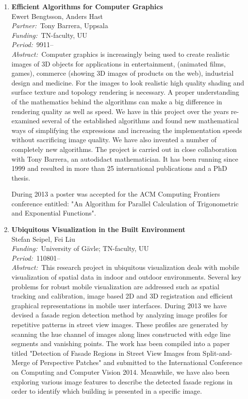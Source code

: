 \documentclass[10pt, a4paper]{article}
\newcommand{\aabstract}[1]{\emph{Abstract:~}#1}
\newcommand{\ffunding}[1]{\emph{Funding:~}#1\\}
\newcommand{\ppartner}[1]{\emph{Partner:~}#1\\}
\newcommand{\pperiod}[1]{\emph{Period:~}#1\\}
\begin{document}
\begin{enumerate}

\item \textbf{Efficient Algorithms for Computer Graphics}\\
Ewert Bengtsson, Anders Hast \\
\ppartner{Tony Barrera, Uppsala}
\ffunding{TN-faculty, UU}
\pperiod{9911--}
\aabstract{Computer graphics is increasingly being used to create realistic images of 3D objects for applications in entertainment, (animated films, games), commerce (showing 3D images of products on the web), industrial design and medicine. For the images to look realistic high quality shading and surface texture and topology rendering is necessary. A proper understanding of the mathematics behind the algorithms can make a big difference in rendering quality as well as speed. We have in this project over the years re-examined several of the established algorithms and found new mathematical ways of simplifying the expressions and increasing the implementation speeds without sacrificing image quality. We have also invented a number of completely new algorithms. The project is carried out in close collaboration with Tony Barrera, an autodidact mathematician. It has been running since 1999 and resulted in more than 25 international publications and a PhD thesis.

During 2013 a poster was accepted for the ACM Computing Frontiers conference entitled: "An Algorithm for Parallel Calculation of Trigonometric and Exponential Functions".}


\item \textbf{Ubiquitous Visualization in the Built Environment}\\
Stefan Seipel, Fei Liu\\
\ffunding{University of G\"{a}vle; TN-faculty, UU}
\pperiod{110801--}%
\aabstract{This research project in ubiquitous visualization deals with mobile visualization of spatial data in indoor and outdoor environments. Several key problems for robust mobile visualization are addressed such as spatial tracking and calibration, image based 2D and 3D registration and efficient graphical representations in mobile user interfaces. During 2013 we have devised a fasade region detection method by analyzing image profiles for repetitive patterns in street view images. These profiles are generated by scanning the hue channel of images along lines constructed with edge line segments and vanishing points. The work has been compiled into a paper titled "Detection of Fasade Regions in Street View Images from Split-and-Merge of Perspective Patches" and submitted to the International Conference on Computing and Computer Vision 2014. Meanwhile, we have also been exploring various image features to describe the detected fasade regions in order to identify which building is presented in a specific image.}


\end{enumerate}
\end{document}
